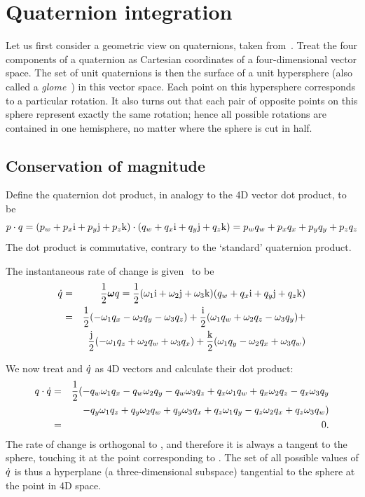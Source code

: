 \section{Quaternion integration\label{quatProofs}}

Let us first consider a geometric view on quaternions, taken from~\cite{Shoemake:85}. Treat
the four components of a quaternion as Cartesian coordinates of a four-dimensional vector
space. The set of unit quaternions is then the surface of a unit hypersphere (also called a
\emph{glome}~\cite{MathWorld:4D}) in this vector space. Each point on this hypersphere
corresponds to a particular rotation. It also turns out that each pair of
opposite points on this sphere represent exactly the same rotation; hence all possible
rotations are contained in one hemisphere, no matter where the sphere is cut in half.

\subsection{Conservation of magnitude\label{quatIntegrationMagnitude}}
Define the quaternion dot product, in analogy to the 4D vector dot product, to be
\begin{equation}
p\cdot q =
    (p_w + p_x\mathrm{i} + p_y\mathrm{j} + p_z\mathrm{k})\cdot (q_w + q_x\mathrm{i} + q_y\mathrm{j} + q_z\mathrm{k}) =
    p_w q_w + p_x q_x + p_y q_y + p_z q_z
\end{equation}
The dot product is commutative, contrary to the `standard' quaternion product.

The instantaneous rate of change is given~\cite{BaraffWitkin:97,Eberly:04,Saunders:PhD} to be
\begin{eqnarray*}
\dot{\q{q}} & = & \frac{1}{2}\ve{\omega}\q{q} =
    \frac{1}{2}(\omega_1\qi + \omega_2\qj + \omega_3\qk)
    (q_w + q_x\qi + q_y\qj + q_z\qk) \\*
& = & \frac{1}{2} ( - \omega_1 q_x - \omega_2 q_y - \omega_3 q_z ) +
    \frac{\qi}{2} ( \omega_1 q_w + \omega_2 q_z - \omega_3 q_y ) + \\*
&&  \frac{\qj}{2} (-\omega_1 q_z + \omega_2 q_w + \omega_3 q_x ) +
    \frac{\qk}{2} ( \omega_1 q_y - \omega_2 q_x + \omega_3 q_w )
\end{eqnarray*}

We now treat  and $\dot{q}$ as 4D vectors and calculate
their dot product:
\begin{eqnarray*}
q\cdot\dot{q} & = & \frac{1}{2} (
    - q_w \omega_1 q_x - q_w \omega_2 q_y - q_w \omega_3 q_z
    + q_x \omega_1 q_w + q_x \omega_2 q_z - q_x \omega_3 q_y \\*
&&  - q_y \omega_1 q_z + q_y \omega_2 q_w + q_y \omega_3 q_x
    + q_z \omega_1 q_y - q_z \omega_2 q_x + q_z \omega_3 q_w ) \\*
& = & 0.
\end{eqnarray*}
The rate of change is orthogonal to , and therefore it is always
a tangent to the sphere, touching it at the point corresponding to . The set of all possible
values of $\dot{q}$ is thus a hyperplane (a three-dimensional subspace) tangential to the
sphere at the point  in 4D space.

